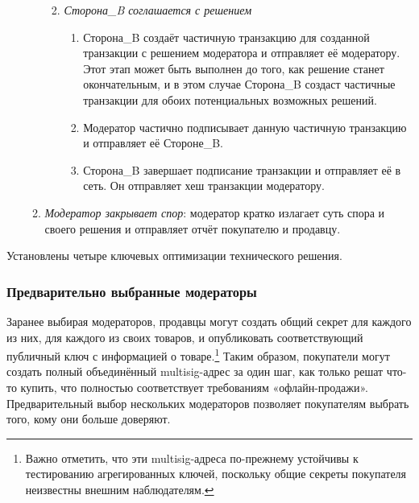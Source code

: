 \begin{enumerate}
\begin{enumerate}
\begin{enumerate}
\begin{enumerate}
            \end{enumerate}{}
            \item {\em Сторона\_B соглашается с решением}
            \begin{enumerate}
                \item Сторона\_B создаёт частичную транзакцию для созданной транзакции с решением модератора и отправляет её модератору. Этот этап может быть выполнен до того, как решение станет окончательным, и в этом случае Сторона\_B создаст частичные транзакции для обоих потенциальных воз\-можных решений.
                \item Модератор частично подписывает данную частичную транзакцию и отправ\-ляет её Стороне\_B.
                \item Сторона\_B завершает подписание транзакции и отправляет её в сеть. Он отправляет хеш транзакции модератору.
            \end{enumerate}{}
        \end{enumerate}{}
        \item {\em Модератор закрывает спор}: модератор кратко излагает суть спора и своего реше\-ния и отправляет отчёт покупателю и продавцу.
    \end{enumerate}{}
\end{enumerate}{}

Установлены четыре ключевых оптимизации технического решения.

\subsubsection*{Предварительно выбранные модераторы}

Заранее выбирая модераторов, продавцы могут создать общий секрет для каждого из них, для каждого из своих товаров, и опубликовать соответствующий публичный ключ с информацией о товаре.\footnote{Важно отметить, что эти multisig-адреса по-прежнему устойчивы к тестированию агрегированных ключей, поскольку общие секреты покупателя неизвестны внешним наблюдателям.} Таким образом, покупатели могут создать полный объединённый multisig-адрес за один шаг, как только решат что-то купить, что полностью соответствует требованиям «офлайн-продажи». Предварительный выбор нескольких модераторов позволяет покупате\-лям выбрать того, кому они больше доверяют.

